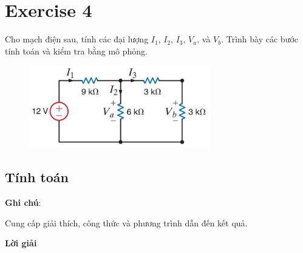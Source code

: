 \section{Exercise 4}
Cho mạch điện sau, tính các đại lượng \(I_1\), \(I_2\), \(I_3\), \(V_a\), và \(V_b\).
Trình bày các bước tính toán và kiểm tra bằng mô phỏng.
\begin{figure}[!htbp]
    \centering
    \includegraphics[width=0.7\textwidth]{graphics/ex4/f1.png}
\end{figure}
\subsection{Tính toán}
\textbf{Ghi chú}:

Cung cấp giải thích, công thức và phương trình dẫn đến kết quả.

\textbf{Lời giải}

